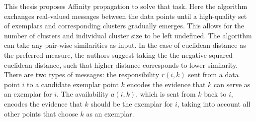 \documentclass[6pt]{article}
\begin{document}
This thesis proposes Affinity propagation \citep{frey2007clustering} to solve that task. Here the algorithm exchanges real-valued messages between the data points until a high-quality set of exemplars and corresponding clusters
gradually emerges. This allows for the number of clusters and individual cluster size to be left undefined. The algorithm can take any pair-wise similarities as input. In the case of euclidean distance as the preferred measure, the authors suggest taking the the negative squared euclidean distance, such that higher distance corresponds to  lower similarity. There are two types of messages: the responsibility $r(i,k)$ sent from a data point $i$ to a candidate exemplar point $k$ encodes the evidence that $k$ can serve as an exemplar for $i$. The availability $a(i,k)$, which is sent from $k$ back to $i$, encodes the evidence that $k$ should be the exemplar for $i$, taking into account all other points that choose $k$ as an exemplar.
\end{document}
